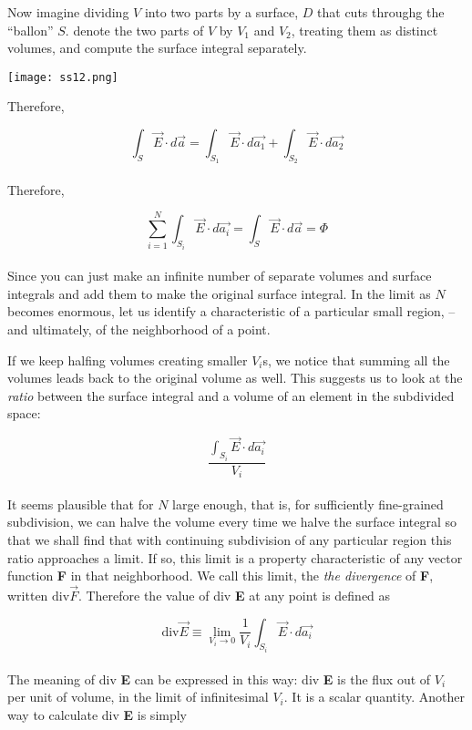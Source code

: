 \documentclass[svgnames]{article}
\begin{document}
Now imagine dividing $V$ into two parts by a surface, $D$ that cuts throughg the ``ballon'' $S$. denote the two parts of $V$ by $V_1$ and $V_2$, treating them as distinct volumes, and compute the surface integral separately. 

\begin{center}
\texttt{[image: ss12.png]}
\end{center} 


Therefore, 

\[ \int_S \vec{E} \cdot d\vec{a} = \int_{S_1} \vec{E} \cdot d\vec{a_1} + \int_{S_2} \vec{E} \cdot d\vec{a_2} \] \\ 

Therefore, 

\[ \sum_{i=1}^N \int_{S_i} \vec{E} \cdot d\vec{a_i} = \int_S \vec{E} \cdot d\vec{a} = \Phi \] \\ 

Since you can just make an infinite number of separate volumes and surface integrals and add them to make the original surface integral. In the limit as $N$ becomes enormous, let us identify a characteristic of a particular small region, -- and ultimately, of the neighborhood of a point.  

If we keep halfing volumes creating smaller $V_i$s, we notice that summing all the volumes leads back to the original volume as well. This suggests us to look at the \textit{ratio} between the surface integral and a volume of an element in the subdivided space: 

\[ \frac{\int_{S_i} \vec{E} \cdot d\vec{a_i}}{V_i} \] \\

It seems plausible that for $N$ large enough, that is, for sufficiently fine-grained subdivision, we can halve the volume every time we halve the surface integral so that we shall find that with continuing subdivision of any particular region this ratio approaches a limit. If so, this limit is a property characteristic of any vector function \textbf{F} in that neighborhood. We call this limit, the \textit{the divergence} of \textbf{F}, written $\text{div} \vec{F}$. Therefore the value of div \textbf{E} at any point is defined as 

\[ \text{div} \vec{E} \equiv \lim_{V_i \to 0} \frac{1}{V_i} \int_{S_i} \vec{E} \cdot d\vec{a_i} \] \\

The meaning of div \textbf{E} can be expressed in this way: div \textbf{E} is the flux out of $V_i$ per unit of volume, in the limit of infinitesimal $V_i$. It is a scalar quantity. Another way to calculate div \textbf{E} is simply 
\end{document}
